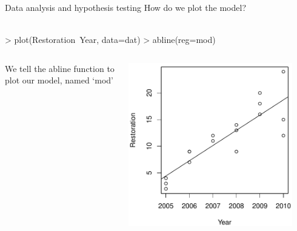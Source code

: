 \documentclass[xcolor=svgnames]{beamer}
\begin{document}
\begin{frame}[fragile]{Data analysis and hypothesis testing}
How do we plot the model?\\~\\
\begin{Schunk}
\begin{Sinput}
> plot(Restoration~Year, data=dat)
> abline(reg=mod)
\end{Sinput}
\end{Schunk}
\vspace{-0.3in}
\begin{columns}
\begin{column}{0.5\textwidth}
We tell the abline function to plot our model, named `mod'
\end{column}
\begin{column}{0.5\textwidth}
\begin{center}
\includegraphics[width=0.9\textwidth]{R_for_data_analysis-reg3.pdf}
\end{center}
\end{column}
\end{columns}
\end{frame}
\end{document}
